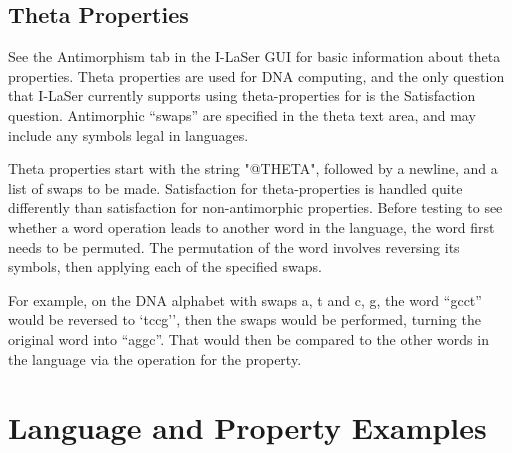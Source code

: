 \documentclass{article}
\begin{document}
\subsection{Theta Properties}
See the Antimorphism tab in the I-LaSer GUI for basic information about theta properties.
Theta properties are used for DNA computing, and the only question that I-LaSer currently supports using theta-properties for is the Satisfaction question.
Antimorphic ``swaps'' are specified in the theta text area, and may include any symbols legal in languages.

Theta properties start with the string "@THETA", followed by a newline, and a list of swaps to be made. 
Satisfaction for theta-properties is handled quite differently than satisfaction for non-antimorphic properties.
Before testing to see whether a word operation leads to another word in the language, the word first needs to be permuted.
The permutation of the word involves reversing its symbols, then applying each of the specified swaps. 

For example, on the DNA alphabet with swaps {a, t} and {c, g}, the word ``gcct'' would be reversed to `tccg'', then the swaps would be performed, turning the original word into ``aggc''.
That would then be compared to the other words in the language via the operation for the property.
\pagebreak
\section{Language and Property Examples}
\end{document}
